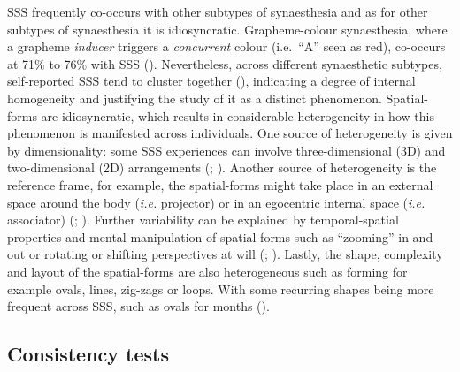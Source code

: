 \documentclass[
  man,
  floatsintext,
  longtable,
  a4paper,
  nolmodern,
  notxfonts,
  notimes,
  colorlinks=true,linkcolor=blue,citecolor=blue,urlcolor=blue]{apa7}
\begin{document}
SSS frequently co-occurs with other subtypes of synaesthesia and as for
other subtypes of synaesthesia it is idiosyncratic. Grapheme-colour
synaesthesia, where a grapheme \emph{inducer} triggers a
\emph{concurrent} colour (i.e.~``A'' seen as red), co-occurs at 71\% to
76\% with SSS ().
Nevertheless, across different synaesthetic subtypes, self-reported SSS
tend to cluster together (), indicating a degree of internal homogeneity and justifying the
study of it as a distinct phenomenon. Spatial-forms are idiosyncratic,
which results in considerable heterogeneity in how this phenomenon is
manifested across individuals. One source of heterogeneity is given by
dimensionality: some SSS experiences can involve three-dimensional (3D)
and two-dimensional (2D) arrangements
(;
). Another source of
heterogeneity is the reference frame, for example, the spatial-forms
might take place in an external space around the body (\emph{i.e.}
projector) or in an egocentric internal space (\emph{i.e.} associator)
(;
). Further variability can
be explained by temporal-spatial properties and mental-manipulation of
spatial-forms such as ``zooming'' in and out or rotating or shifting
perspectives at will (;
). Lastly, the shape,
complexity and layout of the spatial-forms are also heterogeneous such
as forming for example ovals, lines, zig-zags or loops. With some
recurring shapes being more frequent across SSS, such as ovals for
months ().

\subsection{Consistency tests}\label{sec-consistency-tests}

\end{document}
